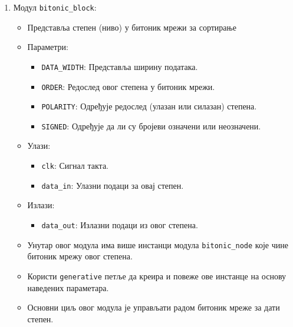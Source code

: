 \documentclass[12pt, a4paper]{article}
\theoremstyle{definition}
\begin{document}
\begin{enumerate}
 \item Модул \verb+bitonic_block+:
 \begin{itemize}
  \item Представља степен (ниво) у битоник мрежи за сортирање
  \item Параметри:
  \begin{itemize}
   \item \verb+DATA_WIDTH+: Представља ширину података.
   \item \verb+ORDER+: Редослед овог степена у битоник мрежи.
   \item \verb+POLARITY+: Одређује редослед (улазан или силазан) степена.
   \item \verb+SIGNED+: Одређује да ли су бројеви означени или неозначени.
  \end{itemize}
  \item Улази:
  \begin{itemize}
   \item \verb+clk+: Сигнал такта.
   \item \verb+data_in+: Улазни подаци за овај степен.
  \end{itemize}
  \item Излази:
  \begin{itemize}
   \item \verb+data_out+: Излазни подаци из овог степена.
  \end{itemize}
  \item Унутар овог модула има више инстанци модула \verb+bitonic_node+ које чине битоник мрежу овог степена.
  \item Користи \verb+generative+ петље да креира и повеже ове инстанце на основу наведених параметара.
  \item Основни циљ овог модула је управљати радом битоник мреже за дати степен.
 \end{itemize}


\end{enumerate}
\end{document}
